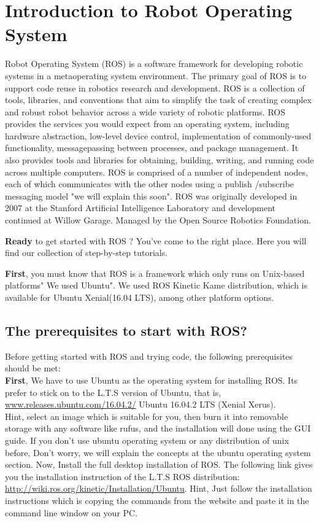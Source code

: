 
\section{Introduction to Robot Operating System}

Robot Operating System (ROS) is a software framework for developing robotic systems in a metaoperating system environment.
The primary goal of ROS is to support code reuse in robotics research and development.
ROS is a collection of tools, libraries, and conventions that aim to simplify the task of creating complex and robust robot behavior across a wide variety of robotic platforms.
ROS provides the services you would expect from an operating system, including hardware abstraction, low-level device control, implementation of commonly-used functionality, messagepassing between processes, and package management.
It also provides tools and libraries for obtaining, building, writing, and running code across multiple computers. 
ROS is comprised of a number of independent nodes, each of which communicates with the other nodes using a publish /subscribe messaging model "we will explain this soon". 
ROS was originally developed in 2007 at the Stanford Artificial Intelligence Laboratory and development continued at Willow Garage. 
Managed by the Open Source Robotics Foundation.

\textbf{Ready} to get started with ROS ? You’ve come to the right place. Here you will find our collection of step-by-step tutorials.

\textbf{First}, you must know that ROS is a framework which only runs on Unix-based platforms" We used Ubuntu". 
We used ROS Kinetic Kame distribution, which is available for Ubuntu Xenial(16.04 LTS), among other platform options.


 \subsection{The prerequisites to start with ROS?}
 	Before getting started with ROS and trying code, the following prerequisites should be met:\\
 
 	\textbf{First}, We have to use Ubuntu as the operating system for installing ROS.
  	Its prefer to stick on to the L.T.S version of Ubuntu, that is, \url{www.releases.ubuntu.com/16.04.2/} Ubuntu 16.04.2 LTS (Xenial Xerus).\\
  	Hint, select an image which is suitable for you, then burn it into removable storage with any software like rufus, and the installation will done using the GUI guide.
  	If you don't use ubuntu operating system or any distribution of unix before, Don't worry, we will explain the concepts at the ubuntu operating system section. 
  	Now, Install the full desktop installation of ROS. The following link gives you the installation instruction of the L.T.S ROS distribution: \url{http://wiki.ros.org/kinetic/Installation/Ubuntu}. 
  	Hint, Just follow the installation instructions which is copying the commands from the website and paste it in the command line window on your PC.
